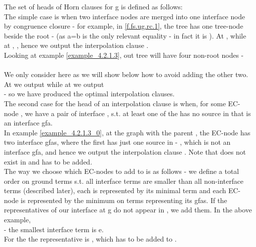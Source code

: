 The set of heads of Horn clauses for g is defined as follows:\\
The simple case is when two interface nodes  are merged into one interface node  by congruence closure - for example, in \ref{f.fs.ug.rc.1}, the tree has one tree-node beside the root -  (as a=b is the only relevant equality - in fact it is ). 
At ,  while at , , hence we output the interpolation clause 
.\\
Looking at example \ref{example_4.2.1.3}, out tree will have four non-root nodes - \\
\\ 
We only consider here  as we will show below how to avoid adding the other two.\\
At  we output  
while at  we output \\
 - so we have produced the optimal interpolation clauses.\\
The second case for the head of an interpolation clause is when, for some EC-node ,
we have a pair of interface \GFAs{} , s.t. at least one of the \GFAs{} has no source in  that is an interface gfa.\\
In example \ref{example_4.2.1.3_0}, at the graph  with the parent ,
the EC-node  has two interface gfas,  where the first \GFA{} has just one source in  - , which is not an interface gfa, and hence we output the interpolation clause .
 Note that  does not exist in  and has to be added.\\
The way we choose which EC-nodes to add to  is as follows - we define a total order on ground terms s.t. all interface terms are smaller than all non-interface terms (described later), each \GFA{} is represented by its minimal term and each EC-node is represented by the minimum on terms representing its gfas. If the representatives of our interface \GFAs{} at g do not appear in , we add them. In the above example, \\
 - the smallest interface term is e. \\
For the \GFA{}  the representative is , which has to be added to .

